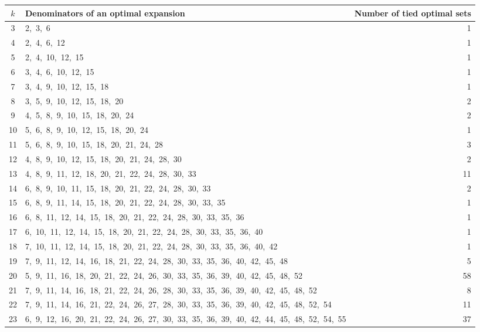 \begin{longtable}{c|p{}|r}
$k$ & Denominators of an optimal expansion & Number of tied optimal sets \\
\hline
\endhead
3 & 2,\ 3,\ 6 & 1 \\
4 & 2,\ 4,\ 6,\ 12 & 1 \\
5 & 2,\ 4,\ 10,\ 12,\ 15 & 1 \\
6 & 3,\ 4,\ 6,\ 10,\ 12,\ 15 & 1 \\
7 & 3,\ 4,\ 9,\ 10,\ 12,\ 15,\ 18 & 1 \\
8 & 3,\ 5,\ 9,\ 10,\ 12,\ 15,\ 18,\ 20 & 2 \\
9 & 4,\ 5,\ 8,\ 9,\ 10,\ 15,\ 18,\ 20,\ 24 & 2 \\
10 & 5,\ 6,\ 8,\ 9,\ 10,\ 12,\ 15,\ 18,\ 20,\ 24 & 1 \\
11 & 5,\ 6,\ 8,\ 9,\ 10,\ 15,\ 18,\ 20,\ 21,\ 24,\ 28 & 3 \\
12 & 4,\ 8,\ 9,\ 10,\ 12,\ 15,\ 18,\ 20,\ 21,\ 24,\ 28,\ 30 & 2 \\
13 & 4,\ 8,\ 9,\ 11,\ 12,\ 18,\ 20,\ 21,\ 22,\ 24,\ 28,\ 30,\ 33 & 11 \\
14 & 6,\ 8,\ 9,\ 10,\ 11,\ 15,\ 18,\ 20,\ 21,\ 22,\ 24,\ 28,\ 30,\ 33 & 2 \\
15 & 6,\ 8,\ 9,\ 11,\ 14,\ 15,\ 18,\ 20,\ 21,\ 22,\ 24,\ 28,\ 30,\ 33,\ 35 & 1 \\
16 & 6,\ 8,\ 11,\ 12,\ 14,\ 15,\ 18,\ 20,\ 21,\ 22,\ 24,\ 28,\ 30,\ 33,\ 35,\ 36 & 1 \\
17 & 6,\ 10,\ 11,\ 12,\ 14,\ 15,\ 18,\ 20,\ 21,\ 22,\ 24,\ 28,\ 30,\ 33,\ 35,\ 36,\ 40 & 1 \\
18 & 7,\ 10,\ 11,\ 12,\ 14,\ 15,\ 18,\ 20,\ 21,\ 22,\ 24,\ 28,\ 30,\ 33,\ 35,\ 36,\ 40,\ 42 & 1 \\
19 & 7,\ 9,\ 11,\ 12,\ 14,\ 16,\ 18,\ 21,\ 22,\ 24,\ 28,\ 30,\ 33,\ 35,\ 36,\ 40,\ 42,\ 45,\ 48 & 5 \\
20 & 5,\ 9,\ 11,\ 16,\ 18,\ 20,\ 21,\ 22,\ 24,\ 26,\ 30,\ 33,\ 35,\ 36,\ 39,\ 40,\ 42,\ 45,\ 48,\ 52 & 58 \\
21 & 7,\ 9,\ 11,\ 14,\ 16,\ 18,\ 21,\ 22,\ 24,\ 26,\ 28,\ 30,\ 33,\ 35,\ 36,\ 39,\ 40,\ 42,\ 45,\ 48,\ 52 & 8 \\
22 & 7,\ 9,\ 11,\ 14,\ 16,\ 21,\ 22,\ 24,\ 26,\ 27,\ 28,\ 30,\ 33,\ 35,\ 36,\ 39,\ 40,\ 42,\ 45,\ 48,\ 52,\ 54 & 11 \\
23 & 6,\ 9,\ 12,\ 16,\ 20,\ 21,\ 22,\ 24,\ 26,\ 27,\ 30,\ 33,\ 35,\ 36,\ 39,\ 40,\ 42,\ 44,\ 45,\ 48,\ 52,\ 54,\ 55 & 37 \\

\end{longtable}
